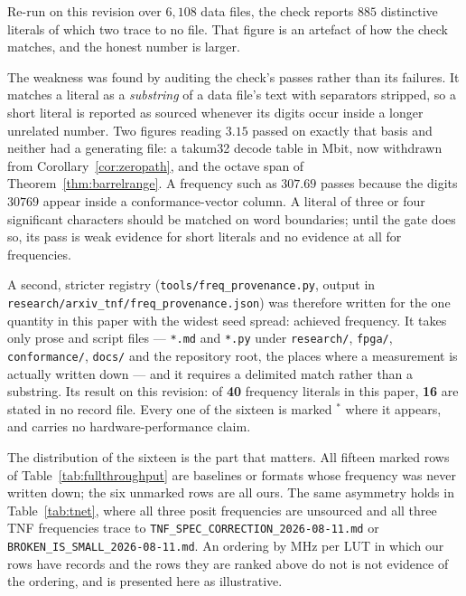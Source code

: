 \documentclass[11pt]{article}
\theoremstyle{definition}
\begin{document}
Re-run on this revision over $6{,}108$ data files, the check reports $885$
distinctive literals of which two trace to no file. That figure is an artefact of
how the check matches, and the honest number is larger.

The weakness was found by auditing the check's passes rather than its failures. It
matches a literal as a \emph{substring} of a data file's text with separators
stripped, so a short literal is reported as sourced whenever its digits occur
inside a longer unrelated number. Two figures reading $3.15$ passed on exactly that
basis and neither had a generating file: a takum32 decode table in Mbit, now
withdrawn from Corollary~\ref{cor:zeropath}, and the octave span of
Theorem~\ref{thm:barrelrange}. A frequency such as $307.69$ passes because the
digits $30769$ appear inside a conformance-vector column. A literal of three or
four significant characters should be matched on word boundaries; until the gate
does so, its pass is weak evidence for short literals and no evidence at all for
frequencies.

A second, stricter registry (\texttt{tools/}\allowbreak\texttt{freq\_provenance.py},
output in \texttt{research/}\allowbreak\texttt{arxiv\_tnf/}\allowbreak\texttt{freq\_provenance.json}) was therefore written for the
one quantity in this paper with the widest seed spread: achieved frequency. It
takes only prose and script files --- \texttt{*.md} and \texttt{*.py} under
\texttt{research/}, \texttt{fpga/}, \texttt{conformance/}, \texttt{docs/} and the
repository root, the places where a measurement is actually written down --- and it
requires a delimited match rather than a substring. Its result on this revision:
of \textbf{40} frequency literals in this paper, \textbf{16} are stated in no
record file. Every one of the sixteen is marked $^{\ast}$ where it appears, and
carries no hardware-performance claim.

The distribution of the sixteen is the part that matters. All fifteen marked rows
of Table~\ref{tab:fullthroughput} are baselines or formats whose frequency was
never written down; the six unmarked rows are all ours. The same asymmetry holds in
Table~\ref{tab:tnet}, where all three posit frequencies are unsourced and all three
TNF frequencies trace to
\texttt{TNF\_SPEC\_CORRECTION\_2026-08-11.md} or
\texttt{BROKEN\_IS\_SMALL\_2026-08-11.md}. An ordering by MHz per LUT in which our
rows have records and the rows they are ranked above do not is not evidence of the
ordering, and is presented here as illustrative.
\end{document}
